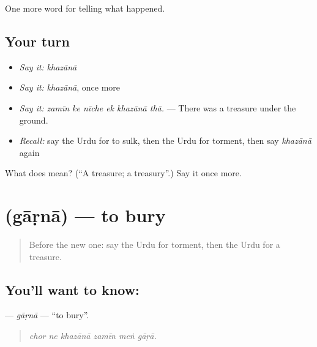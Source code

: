 \begin{grammarlens}[title={What you've built}]
One more word for telling what happened.
\end{grammarlens}

\subsection*{Your turn}
\begin{itemize}
\raggedright
  \item \emph{Say it:} \emph{khazānā}
  \item \emph{Say it:} \emph{khazānā}, once more
  \item \emph{Say it:} \emph{zamīn ke nīche ek khazānā thā.} — There was a treasure under the ground.
  \item \emph{Recall:} say the Urdu for to sulk, then the Urdu for torment, then say \emph{khazānā} again
\end{itemize}

\begin{tcolorbox}[breakable,colback=teal!4,colframe=teal!35!black,title={Before you move on}]
What does  mean? (\textquotedblleft{}A treasure; a treasury\textquotedblright{}.) Say it once more.
\end{tcolorbox}
\section[\texorpdfstring{\ur{گاڑنا} (gāṛnā)}{گاڑنا (gāṛnā)}]{ (gāṛnā) — to bury}

\label{lesson:UR-C327-garna}



\begin{quote}
Before the new one: say the Urdu for torment, then the Urdu for a treasure.
\end{quote}

\subsection*{You'll want to know: }
\textbf{} — \emph{gāṛnā} — \textquotedblleft{}to bury\textquotedblright{}.

\begin{quote}
     
\end{quote}

\begin{quote}
\emph{chor ne khazānā zamīn meṅ gāṛā.}
\end{quote}

